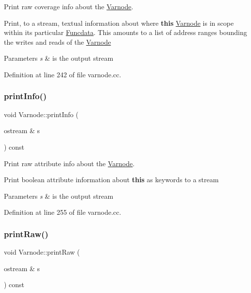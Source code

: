 Print raw coverage info about the \mbox{\hyperlink{class_varnode}{Varnode}}. 

Print, to a stream, textual information about where {\bfseries{this}} \mbox{\hyperlink{class_varnode}{Varnode}} is in scope within its particular \mbox{\hyperlink{class_funcdata}{Funcdata}}. This amounts to a list of address ranges bounding the writes and reads of the \mbox{\hyperlink{class_varnode}{Varnode}} 
\begin{DoxyParams}{Parameters}
{\em s} & is the output stream \\
\hline
\end{DoxyParams}


Definition at line 242 of file varnode.\+cc.

\mbox{\label{class_varnode_ac23b9dc5c3f9e94389d454184f11cff8}} 
\subsubsection{\texorpdfstring{printInfo()}{printInfo()}}
{\footnotesize\ttfamily void Varnode\+::print\+Info (\begin{DoxyParamCaption}\item[{ostream \&}]{s }\end{DoxyParamCaption}) const}



Print raw attribute info about the \mbox{\hyperlink{class_varnode}{Varnode}}. 

Print boolean attribute information about {\bfseries{this}} as keywords to a stream 
\begin{DoxyParams}{Parameters}
{\em s} & is the output stream \\
\hline
\end{DoxyParams}


Definition at line 255 of file varnode.\+cc.

\mbox{\label{class_varnode_aa4c614218fd461a8c5de1e27880f56fe}} 
\subsubsection{\texorpdfstring{printRaw()}{printRaw()}}
{\footnotesize\ttfamily void Varnode\+::print\+Raw (\begin{DoxyParamCaption}\item[{ostream \&}]{s }\end{DoxyParamCaption}) const}



